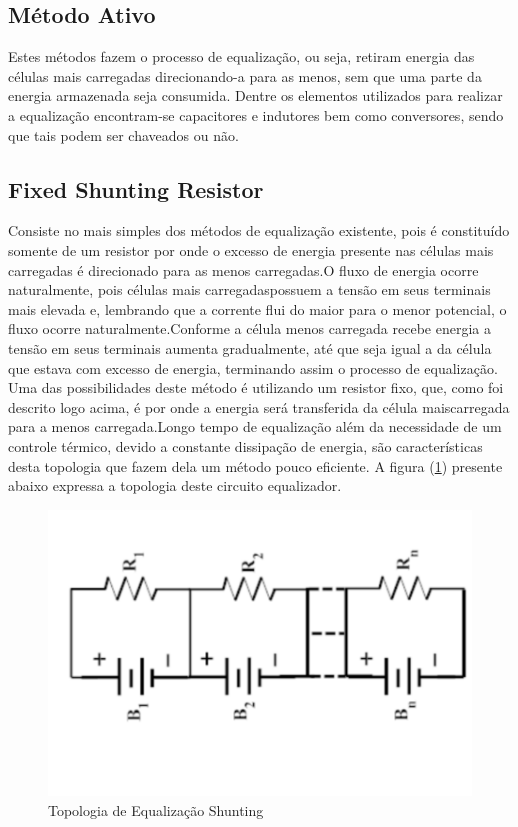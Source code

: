 \documentclass[11pt, a4paper, oneside]{article}
\begin{document}
\subsection{Método Ativo}
Estes métodos fazem o processo de equalização, ou seja, retiram energia das
células mais carregadas direcionando-a para as menos, sem que uma parte da
energia armazenada seja consumida. Dentre os elementos utilizados para realizar
a equalização encontram-se capacitores e indutores bem como conversores, sendo
que tais podem ser chaveados ou não.

\subsection{Fixed Shunting Resistor}
Consiste no mais simples dos métodos de equalização existente, pois é
constituído somente de um resistor por onde o excesso de energia presente nas
células mais carregadas é direcionado para as menos carregadas.O fluxo de energia
ocorre naturalmente, pois células mais carregadaspossuem a tensão em seus
terminais mais elevada e, lembrando que a corrente flui do maior para o menor
potencial, o fluxo ocorre naturalmente.Conforme a célula menos carregada recebe
energia a tensão em seus terminais aumenta gradualmente, até que seja igual a da
célula que estava com excesso de energia, terminando assim o processo de
equalização.\\
Uma das possibilidades deste método é utilizando um resistor fixo, que,
como foi descrito logo acima, é por onde a energia será transferida da célula maiscarregada para a menos carregada.Longo tempo de equalização além da
necessidade de um controle térmico, devido a constante dissipação de energia, são
características desta topologia que fazem dela um método pouco eficiente. A
figura (\ref{fig:estrutura_equalizador_shunting}) presente abaixo expressa a topologia deste circuito equalizador.

\newpage

\begin{figure}[h!]

\centering
\includegraphics[width=0.5\linewidth]{equalizador_ativo}
\caption{Topologia de Equalização Shunting \cite{energy_figure}}
\label{fig:estrutura_equalizador_shunting}
\end{figure}
\end{document}
